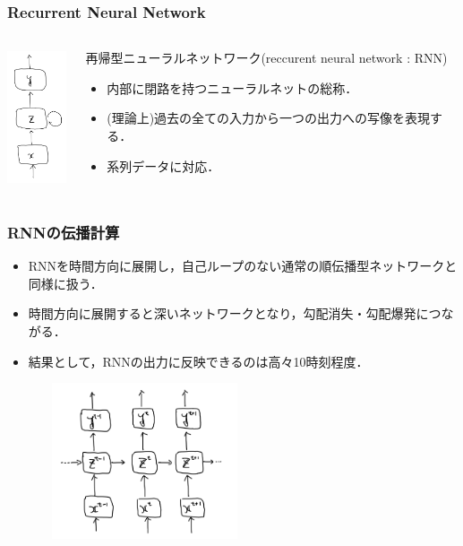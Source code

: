 \documentclass[dvipdfmx]{beamer}
\begin{document}
\begin{frame}
    \frametitle{Recurrent Neural Network}
    \begin{columns}
        \begin{column}[T]{0.20\textwidth}
            \centering
            \includegraphics[width=1.8cm, height=4.0cm]{figure/rnn.png}
        \end{column}
        \begin{column}[T]{0.80\textwidth}
            再帰型ニューラルネットワーク(reccurent neural network : RNN)
            \begin{itemize}
                \item 内部に閉路を持つニューラルネットの総称．
                \item (理論上)過去の全ての入力から一つの出力への写像を表現する．
                \item 系列データに対応．
            \end{itemize}
        \end{column}
    \end{columns}
\end{frame}


\begin{frame}
    \frametitle{RNNの伝播計算}
    \begin{itemize}
        \item RNNを時間方向に展開し，自己ループのない通常の順伝播型ネットワークと同様に扱う．
        \item 時間方向に展開すると深いネットワークとなり，勾配消失・勾配爆発につながる．
        \item 結果として，RNNの出力に反映できるのは高々10時刻程度．
    \end{itemize}

    \begin{figure}
        \begin{center}
            \includegraphics[width=6.0cm, height=4.6cm]{figure/rnn_exp.png}
        \end{center}
    \end{figure}
\end{frame}
\end{document}
